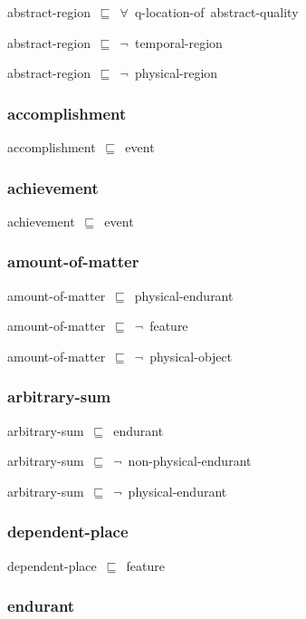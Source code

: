 \documentclass{article}
\begin{document}
abstract-region~\ensuremath{\sqsubseteq}~\ensuremath{\forall}~q-location-of~abstract-quality~

abstract-region~\ensuremath{\sqsubseteq}~\ensuremath{\lnot}~temporal-region

abstract-region~\ensuremath{\sqsubseteq}~\ensuremath{\lnot}~physical-region

\subsubsection*{accomplishment}

accomplishment~\ensuremath{\sqsubseteq}~event~

\subsubsection*{achievement}

achievement~\ensuremath{\sqsubseteq}~event~

\subsubsection*{amount-of-matter}

amount-of-matter~\ensuremath{\sqsubseteq}~physical-endurant~

amount-of-matter~\ensuremath{\sqsubseteq}~\ensuremath{\lnot}~feature

amount-of-matter~\ensuremath{\sqsubseteq}~\ensuremath{\lnot}~physical-object

\subsubsection*{arbitrary-sum}

arbitrary-sum~\ensuremath{\sqsubseteq}~endurant~

arbitrary-sum~\ensuremath{\sqsubseteq}~\ensuremath{\lnot}~non-physical-endurant

arbitrary-sum~\ensuremath{\sqsubseteq}~\ensuremath{\lnot}~physical-endurant

\subsubsection*{dependent-place}

dependent-place~\ensuremath{\sqsubseteq}~feature~

\subsubsection*{endurant}
\end{document}
